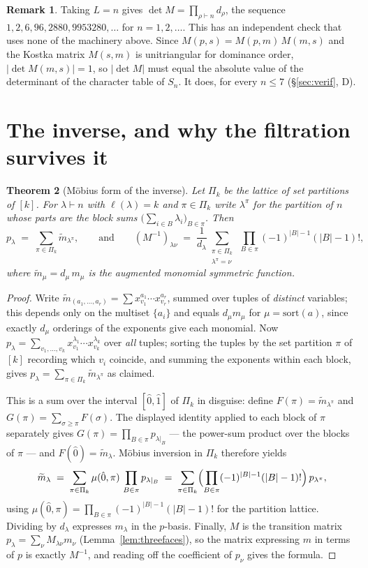 \documentclass[11pt]{article}
\newtheorem{theorem}{Theorem}
\theoremstyle{definition}
\newtheorem{remark}[theorem]{Remark}
\newcommand{\lam}{\lambda}
\begin{document}
\begin{remark}
Taking $L=n$ gives $\det M=\prod_{\rho\vdash n}d_\rho$, the sequence
$1,2,6,96,2880,9953280,\dots$ for $n=1,2,\dots$. This has an independent check that uses none of the
machinery above. Since $M(p,s)=M(p,m)\,M(m,s)$ and the Kostka matrix $M(s,m)$ is unitriangular for
dominance order, $|\det M(m,s)|=1$, so $|\det M|$ must equal the absolute value of the determinant
of the character table of $S_n$. It does, for every $n\le7$ (\S\ref{sec:verif}, D).
\end{remark}

\section{The inverse, and why the filtration survives it}

\begin{theorem}[Möbius form of the inverse]\label{thm:inverse}
Let $\Pi_k$ be the lattice of set partitions of $[k]$. For $\lam\vdash n$ with $\ell(\lam)=k$ and
$\pi\in\Pi_k$ write $\lam^\pi$ for the partition of $n$ whose parts are the block sums
$\bigl(\sum_{i\in B}\lam_i\bigr)_{B\in\pi}$. Then
\[
  p_\lam\;=\;\sum_{\pi\in\Pi_{k}}\widetilde m_{\lam^\pi},
  \qquad\text{and}\qquad
  (M^{-1})_{\lam\nu}\;=\;\frac{1}{d_\lam}\sum_{\substack{\pi\in\Pi_{k}\\ \lam^\pi=\nu}}\ \prod_{B\in\pi}(-1)^{|B|-1}(|B|-1)!,
\]
where $\widetilde m_\mu=d_\mu\,m_\mu$ is the augmented monomial symmetric function.
\end{theorem}

\begin{proof}
Write $\widetilde m_{(a_1,\dots,a_r)}=\sum x_{v_1}^{a_1}\cdots x_{v_r}^{a_r}$, summed over tuples of
\emph{distinct} variables; this depends only on the multiset $\{a_i\}$ and equals $d_\mu m_\mu$ for
$\mu=\mathrm{sort}(a)$, since exactly $d_\mu$ orderings of the exponents give each monomial. Now
$p_\lam=\sum_{v_1,\dots,v_k}x_{v_1}^{\lam_1}\cdots x_{v_k}^{\lam_k}$ over \emph{all} tuples; sorting
the tuples by the set partition $\pi$ of $[k]$ recording which $v_i$ coincide, and summing the
exponents within each block, gives $p_\lam=\sum_{\pi\in\Pi_k}\widetilde m_{\lam^\pi}$ as claimed.

This is a sum over the interval $[\hat0,\hat1]$ of $\Pi_k$ in disguise: define
$F(\pi)=\widetilde m_{\lam^\pi}$ and $G(\pi)=\sum_{\sigma\ge\pi}F(\sigma)$. The displayed identity
applied to each block of $\pi$ separately gives $G(\pi)=\prod_{B\in\pi}p_{\lam|_B}$ --- the
power-sum product over the blocks of $\pi$ --- and $F(\hat0)=\widetilde m_\lam$. Möbius inversion in
$\Pi_k$ therefore yields
\[
  \widetilde m_\lam\;=\;\sum_{\pi\in\Pi_k}\mu(\hat0,\pi)\,\prod_{B\in\pi}p_{\lam|_B}
  \;=\;\sum_{\pi\in\Pi_k}\Bigl(\prod_{B\in\pi}(-1)^{|B|-1}(|B|-1)!\Bigr)\,p_{\lam^\pi},
\]
using $\mu(\hat0,\pi)=\prod_{B\in\pi}(-1)^{|B|-1}(|B|-1)!$ for the partition lattice. Dividing by
$d_\lam$ expresses $m_\lam$ in the $p$-basis. Finally, $M$ is the transition matrix
$p_\lam=\sum_\nu M_{\lam\nu}m_\nu$ (Lemma~\ref{lem:threefaces}), so the matrix expressing $m$ in
terms of $p$ is exactly $M^{-1}$, and reading off the coefficient of $p_\nu$ gives the formula.
\end{proof}
\end{document}
